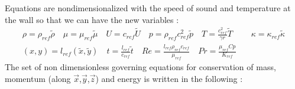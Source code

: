 \documentclass[ border=0pt, a4paper, 11pt]{article}
\numberwithin{equation}{section}
\numberwithin{equation}{section}
\begin{document}
Equations are nondimensionalized with the speed of sound and temperature at the wall so that we can have the new variables :
\begin{align*}
\rho = \rho_{ref}\tilde{\rho} \quad
\mu = \mu_{ref}\tilde{\mu} \quad
U = c_{ref}\tilde{U}  \quad
p = \rho_{ref}c^2_{ref}\tilde{p}  \quad
T = \frac{c^2_{ref}}{\gamma r}\tilde{T} \quad
&\kappa = \kappa_{ref}\tilde{\kappa} \\
(x,y) = l_{ref}(\tilde{x},\tilde{y}) \quad
t =\frac{l_{ref}}{c_{ref}}\tilde{t} \quad   
Re =\frac{l_{ref}\rho_{ref}c_{ref}}{\mu_{ref}} \quad  
Pr =\frac{\mu_{ref}Cp}{K_{ref}} \quad  
\end{align*}
The set of non dimensionless governing equations for conservation of mass, momentum (along $\vec{x}$,$\vec{y}$,$\vec{z}$) and  energy is written in the following :
\end{document}
